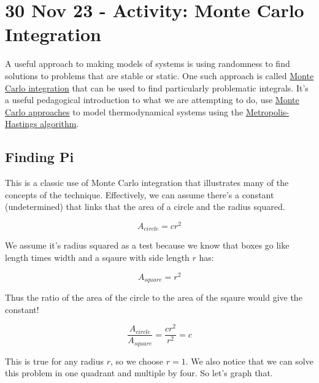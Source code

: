 \section{30 Nov 23 - Activity: Monte Carlo
Integration}\label{nov-23---activity-monte-carlo-integration}

A useful approach to making models of systems is using randomness to
find solutions to problems that are stable or static. One such approach
is called
\href{https://en.wikipedia.org/wiki/Monte_Carlo_integration}{Monte Carlo
integration} that can be used to find particularly problematic
integrals. It's a useful pedagogical introduction to what we are
attempting to do, use
\href{https://en.wikipedia.org/wiki/Monte_Carlo_method}{Monte Carlo
approaches} to model thermodynamical systems using the
\href{https://en.wikipedia.org/wiki/Metropolis\%E2\%80\%93Hastings_algorithm}{Metropolis-Hastings
algorithm}.

\begin{Shaded}
\begin{Highlighting}[]
\OperatorTok{\%}
\end{Highlighting}
\end{Shaded}

\subsection{Finding Pi}\label{finding-pi}

This is a classic use of Monte Carlo integration that illustrates many
of the concepts of the technique. Effectively, we can assume there's a
constant (undetermined) that links that the area of a circle and the
radius squared.

\[A_{circle} = c r^2\]

We assume it's radius squared as a test because we know that boxes go
like length times width and a sqaure with side length \(r\) has:

\[A_{square} = r^2\]

Thus the ratio of the area of the circle to the area of the sqaure would
give the constant!

\[\dfrac{A_{circle}}{A_{square}} = \dfrac{c r^2}{r^2} = c\]

This is true for any radius \(r\), so we choose \(r=1\). We also notice
that we can solve this problem in one quadrant and multiple by four. So
let's graph that.

